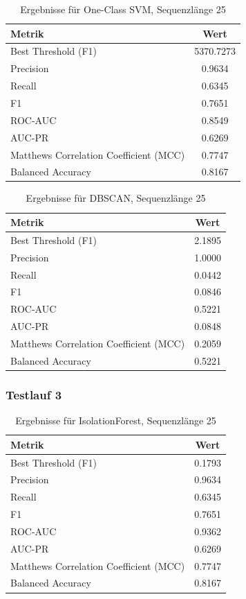 \documentclass[a4paper,12pt]{article}
\begin{document}
	\begin{table}[H]
		\centering
		\begin{tabular}{l c}
			\hline
			Metrik & Wert \\
			\hline
			Best Threshold (F1) & 5370.7273 \\
			Precision & 0.9634 \\
			Recall & 0.6345 \\
			F1 & 0.7651 \\
			ROC-AUC & 0.8549 \\
			AUC-PR & 0.6269 \\
			Matthews Correlation Coefficient (MCC) & 0.7747 \\
			Balanced Accuracy & 0.8167 \\
			\hline
		\end{tabular}
		\caption{Ergebnisse für One-Class SVM, Sequenzlänge 25}
	\end{table}
	
	\begin{table}[H]
		\centering
		\begin{tabular}{l c}
			\hline
			Metrik & Wert \\
			\hline
			Best Threshold (F1) & 2.1895 \\
			Precision & 1.0000 \\
			Recall & 0.0442 \\
			F1 & 0.0846 \\
			ROC-AUC & 0.5221 \\
			AUC-PR & 0.0848 \\
			Matthews Correlation Coefficient (MCC) & 0.2059 \\
			Balanced Accuracy & 0.5221 \\
			\hline
		\end{tabular}
		\caption{Ergebnisse für DBSCAN, Sequenzlänge 25}
	\end{table}
	
	\subsubsection{Testlauf 3}
	
	\begin{table}[H]
		\centering
		\begin{tabular}{l c}
			\hline
			Metrik & Wert \\
			\hline
			Best Threshold (F1) & 0.1793 \\
			Precision & 0.9634 \\
			Recall & 0.6345 \\
			F1 & 0.7651 \\
			ROC-AUC & 0.9362 \\
			AUC-PR & 0.6269 \\
			Matthews Correlation Coefficient (MCC) & 0.7747 \\
			Balanced Accuracy & 0.8167 \\
			\hline
		\end{tabular}
		\caption{Ergebnisse für IsolationForest, Sequenzlänge 25}
	\end{table}
	
\end{document}
